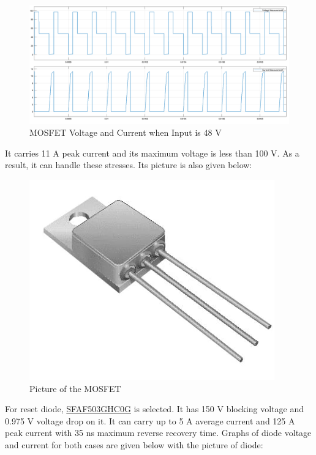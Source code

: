 \documentclass{article}
\newcommand\tab[1][1cm]{\hspace*{#1}}
\begin{document}
\begin{figure}[H]
    \centering
    \includegraphics[scale=0.2]{48v_mosfet.png}
    \caption{MOSFET Voltage and Current when Input is 48 V}
    \label{fig:my_label}
\end{figure}
It carries 11 A peak current and its maximum voltage is less than 100 V. As a result, it can handle these stresses. Its picture is also given below:\\
\begin{figure}[H]
    \centering
    \includegraphics[scale=0.3]{mosfet.PNG}
    \caption{Picture of the MOSFET}
    \label{fig:my_label}
\end{figure}
\tab For reset diode, \href{https://www.taiwansemi.com/products/datasheet/SFAF501G\%20SERIES_H1512.pdf}{SFAF503GHC0G} is selected. It has 150 V blocking voltage and 0.975 V voltage drop on it. It can carry up to 5 A average current and 125 A peak current with 35 ns maximum reverse recovery time. Graphs of diode voltage and current for both cases are given below with the picture of diode:
\end{document}
